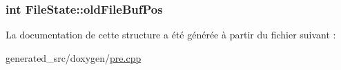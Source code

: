 \subsubsection[{old\+File\+Buf\+Pos}]{\setlength{\rightskip}{0pt plus 5cm}int File\+State\+::old\+File\+Buf\+Pos}\label{struct_file_state_adcbdee9d4290766ae74a8d79115040b6}


La documentation de cette structure a été générée à partir du fichier suivant \+:\begin{DoxyCompactItemize}
\item 
generated\+\_\+src/doxygen/\hyperlink{pre_8cpp}{pre.\+cpp}\end{DoxyCompactItemize}
